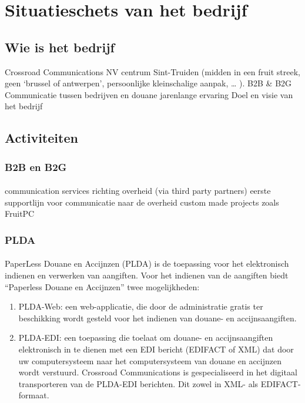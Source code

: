 \section {Situatieschets van het bedrijf}

\subsection {Wie is het bedrijf}
Crossroad Communications NV
centrum Sint-Truiden (midden in een fruit streek, geen ‘brussel of antwerpen’,
persoonlijke kleinschalige aanpak, … ).
B2B \& B2G
Communicatie tussen bedrijven en douane
jarenlange ervaring
Doel en visie van het bedrijf


\subsection {Activiteiten}


\subsubsection {B2B en B2G}

\paragraph {} communication services richting overheid (via third party partners) eerste
supportlijn voor communicatie naar de overheid custom made projects zoals FruitPC


\subsubsection {PLDA}

\paragraph {} PaperLess Douane en Accijnzen (PLDA) is de toepassing voor het elektronisch
indienen en verwerken van aangiften. Voor het indienen van de aangiften biedt “Paperless
Douane en Accijnzen” twee mogelijkheden:

\begin{enumerate}
\item PLDA-Web: een web-applicatie, die door de administratie gratis ter beschikking wordt
gesteld voor het indienen van douane- en accijnsaangiften.

\item PLDA-EDI: een toepassing die toelaat om douane- en accijnsaangiften elektronisch in
te dienen met een EDI bericht (EDIFACT of XML) dat door uw computersysteem naar het
computersysteem van douane en accijnzen wordt verstuurd. Crossroad Communications is
gespecialiseerd in het digitaal transporteren van de PLDA-EDI berichten. Dit zowel in XML-
als EDIFACT-formaat.
\end{enumerate}


